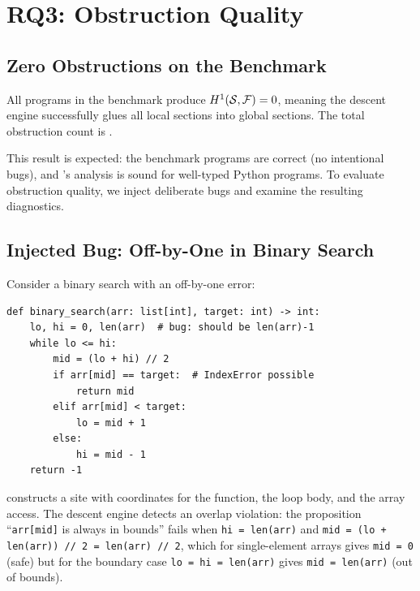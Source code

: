 \documentclass[11pt]{article}
\newcommand{\Sect}{\mathcal{F}}             %
\begin{document}
\section{RQ3: Obstruction Quality}\label{sec:rq3}

\subsection{Zero Obstructions on the Benchmark}

All \expHOneZero{} programs in the benchmark produce
$\Hcoh{1}(\Site, \Sect) = 0$, meaning the descent engine
successfully glues all local sections into global sections.
The total obstruction count is \expObstructionTotal{}.

This result is expected: the benchmark programs are correct (no
intentional bugs), and \JuGeo{}'s analysis is sound for well-typed
Python programs.  To evaluate obstruction quality, we inject
deliberate bugs and examine the resulting diagnostics.

\subsection{Injected Bug: Off-by-One in Binary Search}

Consider a binary search with an off-by-one error:

\begin{lstlisting}[style=jugeo-python,caption={Buggy binary search.}]
def binary_search(arr: list[int], target: int) -> int:
    lo, hi = 0, len(arr)  # bug: should be len(arr)-1
    while lo <= hi:
        mid = (lo + hi) // 2
        if arr[mid] == target:  # IndexError possible
            return mid
        elif arr[mid] < target:
            lo = mid + 1
        else:
            hi = mid - 1
    return -1
\end{lstlisting}

\JuGeo{} constructs a site with coordinates for the function, the
loop body, and the array access.  The descent engine detects an
overlap violation: the proposition ``\texttt{arr[mid]} is always
in bounds'' fails when \texttt{hi = len(arr)} and
\texttt{mid = (lo + len(arr)) // 2 = len(arr) // 2}, which for
single-element arrays gives \texttt{mid = 0} (safe) but for the
boundary case \texttt{lo = hi = len(arr)} gives
\texttt{mid = len(arr)} (out of bounds).
\end{document}
